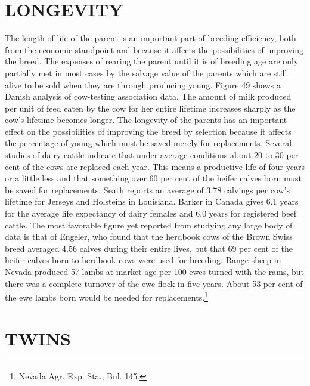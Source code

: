 \section*{LONGEVITY}

The length of life of the parent is an important part of breeding
efficiency, both from the economic standpoint and because it affects the
possibilities of improving the breed. The expenses of rearing the parent
until it is of breeding age are only partially met in most cases by the
salvage value of the parents which are still alive to be sold when they
are through producing young. Figure 49 shows a Danish analysis of cow-testing
association data. The amount of milk produced per unit of feed
eaten by the cow for her entire lifetime increases sharply as the cow's
lifetime becomes longer. The longevity of the parents has an important
effect on the possibilities of improving the breed by selection because it
affects the percentage of young which must be saved merely for replacements.
Several studies of dairy cattle indicate that under average conditions
about 20 to 30 per cent of the cows are replaced each year. This
means a productive life of four years or a little less and that something
over 60 per cent of the heifer calves born must be saved for replacements.
Seath reports an average of 3.78 calvings per cow's lifetime for
Jerseys and Holsteins in Louisiana. Barker in Canada gives 6.1 years for
the average life expectancy of dairy females and 6.0 years for registered
beef cattle. The most favorable figure yet reported from studying any
large body of data is that of Engeler, who found that the herdbook cows
of the Brown Swiss breed averaged 4.56 calves during their entire lives,
but that 69 per cent of the heifer calves born to herdbook cows were
used for breeding. Range sheep in Nevada produced 57 lambs at market
age per 100 ewes turned with the rams, but there was a complete
turnover of the ewe flock in five years. About 53 per cent of the ewe
lambs born would be needed for replacements.\footnote{Nevada Agr. Exp. Sta.,
Bul. 145.}

\section*{TWINS}

